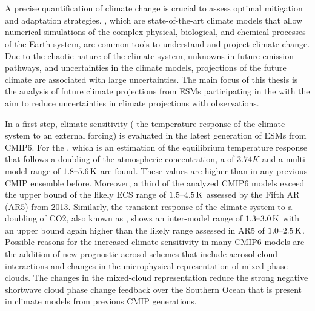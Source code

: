 
%



\chapter{\abstractname}

A precise quantification of climate change is crucial to assess optimal
mitigation and adaptation strategies. , which are
state-of-the-art climate models that allow numerical simulations of the complex
physical, biological, and chemical processes of the Earth system, are common
tools to understand and project climate change. Due to the chaotic nature of
the climate system, unknowns in future emission pathways, and uncertainties in
the climate models, projections of the future climate are associated with large
uncertainties. The main focus of this thesis is the analysis of future climate
projections from \acsp{ESM} participating in the  with the
aim to reduce uncertainties in climate projections with observations.

In a first step, climate sensitivity (\ie{} the temperature response of the
climate system to an external forcing) is evaluated in the latest generation of
\acsp{ESM} from \acs{CMIP}6. For the , which is an estimation
of the equilibrium temperature response that follows a doubling of the
atmospheric  concentration, a  of $3.74
\unit{K}$ and a multi-model range of $\rangeunit{1.8}{5.6}{K}$ are found. These
values are higher than in any previous \acs{CMIP} ensemble before. Moreover, a
third of the analyzed \acs{CMIP}6 models exceed the upper bound of the likely
\acs{ECS} range of $\rangeunit{1.5}{4.5}{K}$ assessed by the 
Fifth \acl{AR} (\acs{AR}5) from 2013. Similarly, the transient response of the
climate system to a doubling of \acs{CO2}, also known as ,
shows an inter-model range of $\rangeunit{1.3}{3.0}{K}$ with an upper bound
again higher than the likely range assessed in \acs{AR}5 of
$\rangeunit{1.0}{2.5}{K}$. Possible reasons for the increased climate
sensitivity in many \acs{CMIP}6 models are the addition of new prognostic
aerosol schemes that include aerosol-cloud interactions and changes in the
microphysical representation of mixed-phase clouds. The changes in the
mixed-cloud representation reduce the strong negative shortwave cloud phase
change feedback over the Southern Ocean that is present in climate models from
previous \acs{CMIP} generations.


